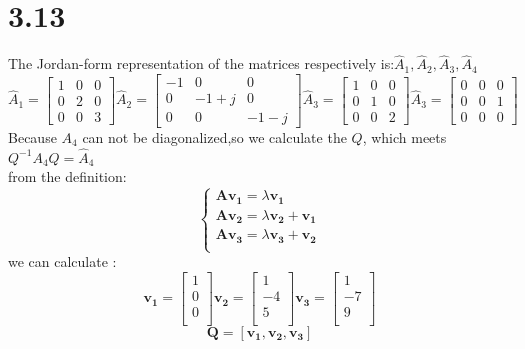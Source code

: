 \documentclass{article}
\begin{document}
\section*{3.13}
The Jordan-form representation of the matrices respectively is:$\hat{A}_{1},\hat{A}_{2},\hat{A}_{3},\hat{A}_{4}$
\begin{equation*}
\hat{A}_{1}=\left[\begin{array}{lll}
1 & 0 & 0 \\
0 & 2 & 0 \\
0 & 0 & 3
\end{array}\right]
\hat{A}_{2}=\left[\begin{array}{ccc}
    -1 & 0 & 0 \\
    0 & -1+j & 0 \\
    0 & 0 & -1-j
    \end{array}\right]
\hat{A}_{3}=\left[\begin{array}{lll}
    1 & 0 & 0 \\
    0 & 1 & 0 \\
    0 & 0 & 2
    \end{array}\right]
\hat{A}_{3}=\left[\begin{array}{lll}
    0 & 0 & 0 \\
    0 & 0 & 1 \\
    0 & 0 & 0
    \end{array}\right]
\end{equation*}
Because $A_4$ can not be diagonalized,so we calculate the $Q$,
which meets $Q^{-1}A_4Q=\hat{A}_{4}$\\
from the definition:
$$
\left\{\begin{array}{ll}
\boldsymbol{Av_1}=\lambda\boldsymbol{v_1}\\
\boldsymbol{Av_2}=\lambda\boldsymbol{v_2}+\boldsymbol{v_1}\\
\boldsymbol{Av_3}=\lambda\boldsymbol{v_3}+\boldsymbol{v_2}\\
\end{array}\right.
$$
we can calculate :
\begin{equation*}
\boldsymbol{v_1}=
\left[
\begin{array}{c}
1\\
0\\
0\\
\end{array}
\right]
\boldsymbol{v_2}=
\left[
\begin{array}{c}
1\\
-4\\
5\\
\end{array}
\right]
\boldsymbol{v_3}=
\left[
\begin{array}{c}
1\\
-7\\
9\\
\end{array}
\right]
\end{equation*}
\[\boldsymbol{Q}=[\boldsymbol{v_1,v_2,v_3}]\]
\end{document}
